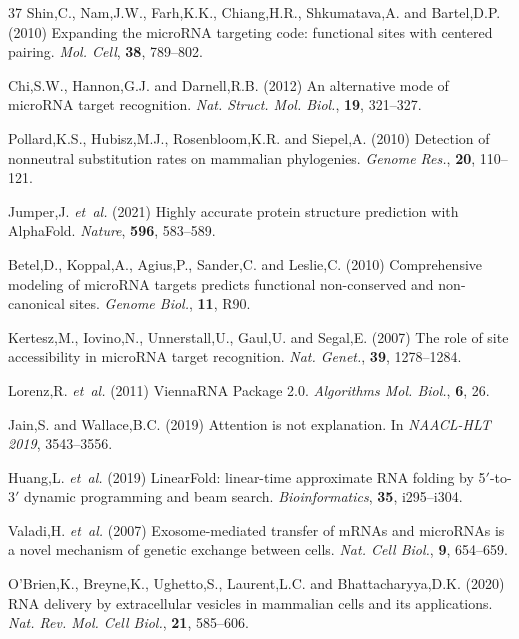 \documentclass[unnumsec,webpdf,contemporary,large]{oup-authoring-template}
\begin{document}
\begin{thebibliography}{37}
Shin,C., Nam,J.W., Farh,K.K., Chiang,H.R., Shkumatava,A. and Bartel,D.P. (2010) Expanding the microRNA targeting code: functional sites with centered pairing. \textit{Mol. Cell}, \textbf{38}, 789--802.

Chi,S.W., Hannon,G.J. and Darnell,R.B. (2012) An alternative mode of microRNA target recognition. \textit{Nat. Struct. Mol. Biol.}, \textbf{19}, 321--327.

Pollard,K.S., Hubisz,M.J., Rosenbloom,K.R. and Siepel,A. (2010) Detection of nonneutral substitution rates on mammalian phylogenies. \textit{Genome Res.}, \textbf{20}, 110--121.

Jumper,J. \textit{et~al.} (2021) Highly accurate protein structure prediction with AlphaFold. \textit{Nature}, \textbf{596}, 583--589.

Betel,D., Koppal,A., Agius,P., Sander,C. and Leslie,C. (2010) Comprehensive modeling of microRNA targets predicts functional non-conserved and non-canonical sites. \textit{Genome Biol.}, \textbf{11}, R90.

Kertesz,M., Iovino,N., Unnerstall,U., Gaul,U. and Segal,E. (2007) The role of site accessibility in microRNA target recognition. \textit{Nat. Genet.}, \textbf{39}, 1278--1284.

Lorenz,R. \textit{et~al.} (2011) ViennaRNA Package 2.0. \textit{Algorithms Mol. Biol.}, \textbf{6}, 26.

Jain,S. and Wallace,B.C. (2019) Attention is not explanation. In \textit{NAACL-HLT 2019}, 3543--3556.

Huang,L. \textit{et~al.} (2019) LinearFold: linear-time approximate RNA folding by 5$'$-to-3$'$ dynamic programming and beam search. \textit{Bioinformatics}, \textbf{35}, i295--i304.

Valadi,H. \textit{et~al.} (2007) Exosome-mediated transfer of mRNAs and microRNAs is a novel mechanism of genetic exchange between cells. \textit{Nat. Cell Biol.}, \textbf{9}, 654--659.

O'Brien,K., Breyne,K., Ughetto,S., Laurent,L.C. and Bhattacharyya,D.K. (2020) RNA delivery by extracellular vesicles in mammalian cells and its applications. \textit{Nat. Rev. Mol. Cell Biol.}, \textbf{21}, 585--606.


\end{thebibliography}
\end{document}
